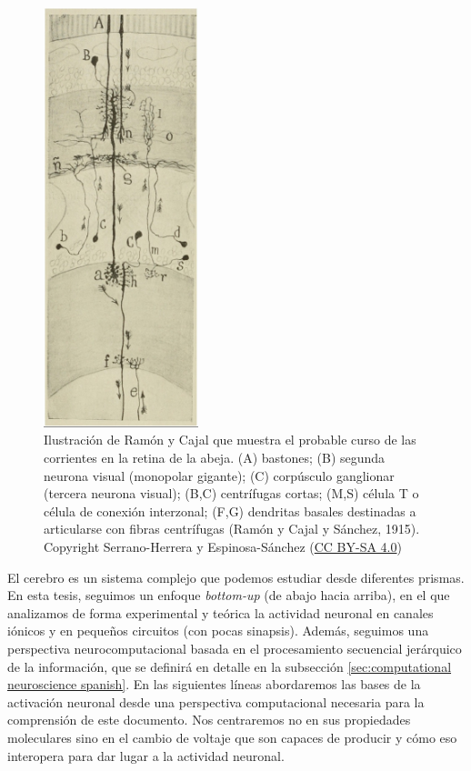 \begin{figure}[htb!]
    \centering
    \includegraphics[width=0.4\textwidth]{img/intro/cajal-flow_small.jpg}
    \caption{Ilustración de Ramón y Cajal que muestra el probable curso de las corrientes en la retina de la abeja. (A) bastones; (B) segunda neurona visual (monopolar gigante); (C) corpúsculo ganglionar (tercera neurona visual); (B,C) centrífugas cortas; (M,S) célula T o célula de conexión interzonal; (F,G) dendritas basales destinadas a articularse con fibras centrífugas (Ramón y Cajal y Sánchez, 1915). Copyright Serrano-Herrera y Espinosa-Sánchez \cite{serrano-herrera_domingo_2024} (\href{https://creativecommons.org/licenses/by-sa/4.0/}{CC BY-SA 4.0})}
    \label{fig:cajal-neuron spanish}
\end{figure}

El cerebro es un sistema complejo que podemos estudiar desde diferentes prismas. En esta tesis, seguimos un enfoque \textit{bottom-up} (de abajo hacia arriba), en el que analizamos de forma experimental y teórica la actividad neuronal en canales iónicos y en pequeños circuitos (con pocas sinapsis). Además, seguimos una perspectiva neurocomputacional basada en el procesamiento secuencial jerárquico de la información, que se definirá en detalle en la subsección \ref{sec:computational neuroscience spanish}. En las siguientes líneas abordaremos las bases de la activación neuronal desde una perspectiva computacional necesaria para la comprensión de este documento. Nos centraremos no en sus propiedades moleculares sino en el cambio de voltaje que son capaces de producir y cómo eso interopera para dar lugar a la actividad neuronal.



